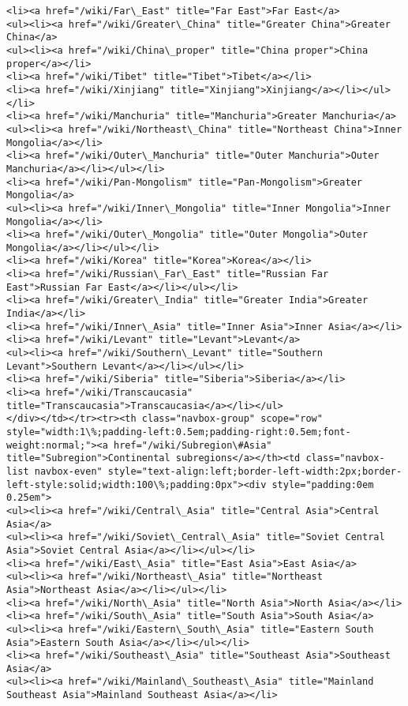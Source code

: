 \documentclass[11pt]{article}
\begin{document}
\begin{Verbatim}[commandchars=\\\{\}]
<li><a href="/wiki/Far\_East" title="Far East">Far East</a>
<ul><li><a href="/wiki/Greater\_China" title="Greater China">Greater China</a>
<ul><li><a href="/wiki/China\_proper" title="China proper">China proper</a></li>
<li><a href="/wiki/Tibet" title="Tibet">Tibet</a></li>
<li><a href="/wiki/Xinjiang" title="Xinjiang">Xinjiang</a></li></ul></li>
<li><a href="/wiki/Manchuria" title="Manchuria">Greater Manchuria</a>
<ul><li><a href="/wiki/Northeast\_China" title="Northeast China">Inner Mongolia</a></li>
<li><a href="/wiki/Outer\_Manchuria" title="Outer Manchuria">Outer Manchuria</a></li></ul></li>
<li><a href="/wiki/Pan-Mongolism" title="Pan-Mongolism">Greater Mongolia</a>
<ul><li><a href="/wiki/Inner\_Mongolia" title="Inner Mongolia">Inner Mongolia</a></li>
<li><a href="/wiki/Outer\_Mongolia" title="Outer Mongolia">Outer Mongolia</a></li></ul></li>
<li><a href="/wiki/Korea" title="Korea">Korea</a></li>
<li><a href="/wiki/Russian\_Far\_East" title="Russian Far East">Russian Far East</a></li></ul></li>
<li><a href="/wiki/Greater\_India" title="Greater India">Greater India</a></li>
<li><a href="/wiki/Inner\_Asia" title="Inner Asia">Inner Asia</a></li>
<li><a href="/wiki/Levant" title="Levant">Levant</a>
<ul><li><a href="/wiki/Southern\_Levant" title="Southern Levant">Southern Levant</a></li></ul></li>
<li><a href="/wiki/Siberia" title="Siberia">Siberia</a></li>
<li><a href="/wiki/Transcaucasia" title="Transcaucasia">Transcaucasia</a></li></ul>
</div></td></tr><tr><th class="navbox-group" scope="row" style="width:1\%;padding-left:0.5em;padding-right:0.5em;font-weight:normal;"><a href="/wiki/Subregion\#Asia" title="Subregion">Continental subregions</a></th><td class="navbox-list navbox-even" style="text-align:left;border-left-width:2px;border-left-style:solid;width:100\%;padding:0px"><div style="padding:0em 0.25em">
<ul><li><a href="/wiki/Central\_Asia" title="Central Asia">Central Asia</a>
<ul><li><a href="/wiki/Soviet\_Central\_Asia" title="Soviet Central Asia">Soviet Central Asia</a></li></ul></li>
<li><a href="/wiki/East\_Asia" title="East Asia">East Asia</a>
<ul><li><a href="/wiki/Northeast\_Asia" title="Northeast Asia">Northeast Asia</a></li></ul></li>
<li><a href="/wiki/North\_Asia" title="North Asia">North Asia</a></li>
<li><a href="/wiki/South\_Asia" title="South Asia">South Asia</a>
<ul><li><a href="/wiki/Eastern\_South\_Asia" title="Eastern South Asia">Eastern South Asia</a></li></ul></li>
<li><a href="/wiki/Southeast\_Asia" title="Southeast Asia">Southeast Asia</a>
<ul><li><a href="/wiki/Mainland\_Southeast\_Asia" title="Mainland Southeast Asia">Mainland Southeast Asia</a></li>

\end{Verbatim}
\end{document}
